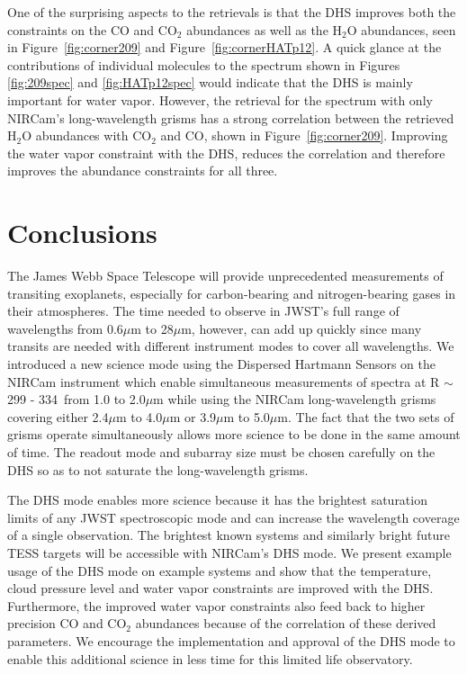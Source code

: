 \documentclass[iop]{emulateapj}
\newcommand{\DHSres}{299 - 334}
\begin{document}

One of the surprising aspects to the retrievals is that the DHS improves both the constraints on the CO and CO$_2$ abundances as well as the H$_2$O abundances, seen in Figure~\ref{fig:corner209} and Figure~\ref{fig:cornerHATp12}. 
A quick glance at the contributions of individual molecules to the spectrum shown in Figures \ref{fig:209spec} and \ref{fig:HATp12spec} would indicate that the DHS is mainly important for water vapor.
However, the retrieval for the spectrum with only NIRCam's long-wavelength grisms has a strong correlation between the retrieved H$_2$O abundances with CO$_2$ and CO, shown in Figure~\ref{fig:corner209}.
Improving the water vapor constraint with the DHS, reduces the correlation and therefore improves the abundance constraints for all three.






\section{Conclusions}

The James Webb Space Telescope will provide unprecedented measurements of transiting exoplanets, especially for carbon-bearing and nitrogen-bearing gases in their atmospheres.
The time needed to observe in JWST's full range of wavelengths from 0.6$\mu$m to 28$\mu$m, however, can add up quickly since many transits are needed with different instrument modes to cover all wavelengths.
We introduced a new science mode using the Dispersed Hartmann Sensors on the NIRCam instrument which enable simultaneous measurements of spectra at R $\sim$ \DHSres\ from 1.0 to 2.0$\mu$m while using the NIRCam long-wavelength grisms covering either 2.4$\mu$m to 4.0$\mu$m or 3.9$\mu$m to 5.0$\mu$m.
The fact that the two sets of grisms operate simultaneously allows more science to be done in the same amount of time.
The readout mode and subarray size must be chosen carefully on the DHS so as to not saturate the long-wavelength grisms.

The DHS mode enables more science because it has the brightest saturation limits of any JWST spectroscopic mode and can increase the wavelength coverage of a single observation.
The brightest known systems and similarly bright future TESS targets will be accessible with NIRCam's DHS mode.
We present example usage of the DHS mode on example systems and show that the temperature, cloud pressure level and water vapor constraints are improved with the DHS.
Furthermore, the improved water vapor constraints also feed back to higher precision CO and CO$_2$ abundances because of the correlation of these derived parameters.
We encourage the implementation and approval of the DHS mode to enable this additional science in less time for this limited life observatory.
\end{document}
